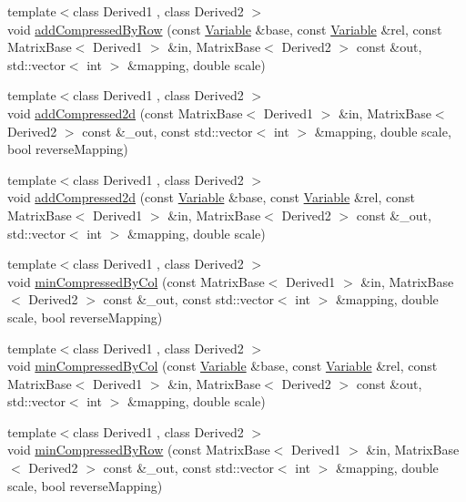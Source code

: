 \begin{DoxyCompactItemize}
\item 
{\footnotesize template$<$class Derived1 , class Derived2 $>$ }\\void \hyperlink{namespaceocra_1_1utils_a0ca59cf5c0fd0b8e92a0aa53d85e0aca}{add\+Compressed\+By\+Row} (const \hyperlink{classocra_1_1Variable}{Variable} \&base, const \hyperlink{classocra_1_1Variable}{Variable} \&rel, const Matrix\+Base$<$ Derived1 $>$ \&in, Matrix\+Base$<$ Derived2 $>$ const \&out, std\+::vector$<$ int $>$ \&mapping, double scale)
\item 
{\footnotesize template$<$class Derived1 , class Derived2 $>$ }\\void \hyperlink{namespaceocra_1_1utils_ad4dfd96e7620a1cadabe53db0cdf969d}{add\+Compressed2d} (const Matrix\+Base$<$ Derived1 $>$ \&in, Matrix\+Base$<$ Derived2 $>$ const \&\+\_\+out, const std\+::vector$<$ int $>$ \&mapping, double scale, bool reverse\+Mapping)
\item 
{\footnotesize template$<$class Derived1 , class Derived2 $>$ }\\void \hyperlink{namespaceocra_1_1utils_af486ff6d7c311e33a0c7d647eb45bcd6}{add\+Compressed2d} (const \hyperlink{classocra_1_1Variable}{Variable} \&base, const \hyperlink{classocra_1_1Variable}{Variable} \&rel, const Matrix\+Base$<$ Derived1 $>$ \&in, Matrix\+Base$<$ Derived2 $>$ const \&\+\_\+out, std\+::vector$<$ int $>$ \&mapping, double scale)
\item 
{\footnotesize template$<$class Derived1 , class Derived2 $>$ }\\void \hyperlink{namespaceocra_1_1utils_ab527c3744d4c3ca93750164c91a9c3dd}{min\+Compressed\+By\+Col} (const Matrix\+Base$<$ Derived1 $>$ \&in, Matrix\+Base$<$ Derived2 $>$ const \&\+\_\+out, const std\+::vector$<$ int $>$ \&mapping, double scale, bool reverse\+Mapping)
\item 
{\footnotesize template$<$class Derived1 , class Derived2 $>$ }\\void \hyperlink{namespaceocra_1_1utils_aa4b4cd7a5d18ae426d5aa2fb46d20902}{min\+Compressed\+By\+Col} (const \hyperlink{classocra_1_1Variable}{Variable} \&base, const \hyperlink{classocra_1_1Variable}{Variable} \&rel, const Matrix\+Base$<$ Derived1 $>$ \&in, Matrix\+Base$<$ Derived2 $>$ const \&out, std\+::vector$<$ int $>$ \&mapping, double scale)
\item 
{\footnotesize template$<$class Derived1 , class Derived2 $>$ }\\void \hyperlink{namespaceocra_1_1utils_ae8dc2eb14db238a75ea0a8bf499e4902}{min\+Compressed\+By\+Row} (const Matrix\+Base$<$ Derived1 $>$ \&in, Matrix\+Base$<$ Derived2 $>$ const \&\+\_\+out, const std\+::vector$<$ int $>$ \&mapping, double scale, bool reverse\+Mapping)

\end{DoxyCompactItemize}
